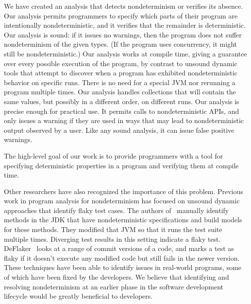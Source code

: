 We have created an analysis that detects nondeterminism or verifies its
absence.
Our analysis permits programmers to specify which parts of their program
are intentionally nondeterministic, and it verifies that the remainder is deterministic.
%
Our analysis is sound:  if it issues no warnings, then the program does not
suffer nondeterminism of the given types.  (If the program uses concurrency,
it might still be nondeterministic.)
%
Our analysis works at compile time, giving a guarantee over every possible
execution of the program, by contrast to unsound dynamic tools that attempt
to discover when a program has exhibited nondeterministic behavior on
specific runs.  There is no need for a special JVM nor rerunning a program
multiple times.
%
Our analysis handles collections that will contain the same values, but
possibly in a different order, on different runs.
%
Our analysis is precise enough for practical use.  It permits calls to
nondeterministic APIs, and only issues a warning if they are used in ways
that may lead to nondeterministic output observed by a user.  Like any
sound analysis, it can issue false positive warnings.



The high-level goal of our work is to provide programmers with a tool for
specifying deterministic properties in a program and verifying them
at compile time.


Other researchers have also recognized the importance of this problem.
Previous work in program analysis for nondeterminism has focused on unsound dynamic
approaches that identify flaky test cases.
The authors of~\cite{nondex} manually identify methods in the JDK that have nondeterministic specifications and build models for
these methods. They  modified that JVM so that it runs the test suite multiple times.
Diverging test results in this setting indicate a flaky test. DeFlaker~\cite{deflaker} looks at a range of commit versions
of a code, and marks a test as flaky if it doesn't execute any modified code but still fails in the newer version. These techniques
have been able to identify issues in real-world programs, some of which
have been fixed by the developers. We believe that identifying and
resolving nondeterminism
at an earlier phase in the software development lifecycle would be greatly beneficial to
developers.

